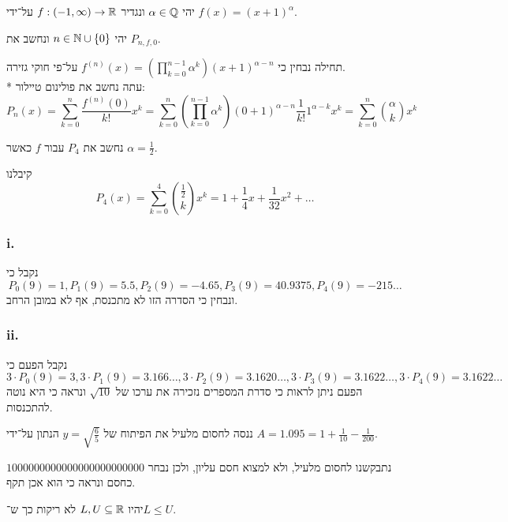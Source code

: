 \Question{}
יהי $\alpha \in \mathbb{Q}$ ונגדיר $f : (-1, \infty) \to \mathbb{R}$ על־ידי $f(x) = {(x + 1)}^\alpha$.

\Subquestion{}
יהי $n \in \mathbb{N} \cup \{0\}$ ונחשב את $P_{n, f, 0}$.

תחילה נבחין כי $f^{(n)}(x) = (\prod_{k = 0}^{n - 1} \alpha^k) {(x + 1)}^{\alpha - n}$ על־פי חוקי גזירה. \\*
עתה נחשב את פולינום טיילור:
\[
	P_n(x) = \sum_{k = 0}^{n} \frac{f^{(n)}(0)}{k!} x^k
	= \sum_{k = 0}^{n} (\prod_{k = 0}^{n - 1} \alpha^k) {(0 + 1)}^{\alpha - n} \frac{1}{k!} 1^{\alpha - k} x^k
	= \sum_{k = 0}^{n} \binom{\alpha}{k} x^k
\]

\Subquestion{}
נחשב את $P_4$ עבור $f$ כאשר $\alpha = \frac{1}{2}$.

קיבלנו
\[
	P_4(x) = \sum_{k = 0}^{4} \binom{\frac{1}{2}}{k} x^k
	= 1 + \frac{1}{4} x + \frac{1}{32} x^2 + \dots
\]

\Subquestion{}
\subsubsection{i.}
נקבל כי
\[
	P_0(9) = 1,
	P_1(9) = 5.5,
	P_2(9) = -4.65,
	P_3(9) = 40.9375,
	P_4(9) = -215\dots
\]
ונבחין כי הסדרה הזו לא מתכנסת, אף לא במובן הרחב.

\subsubsection{ii.}
נקבל הפעם כי
\[
	3 \cdot P_0(9) = 3,
	3 \cdot P_1(9) = 3.166\dots,
	3 \cdot P_2(9) = 3.1620\dots,
	3 \cdot P_3(9) = 3.1622\dots,
	3 \cdot P_4(9) = 3.1622\dots
\]
הפעם ניתן לראות כי סדרת המספרים נזכירה את ערכו של $\sqrt{10}$ ונראה כי היא נוטה להתכנסות.

\Subquestion{}
ננסה לחסום מלעיל את הפיתוח של $y = \sqrt{\frac{6}{5}}$ הנתון על־ידי $A = 1.095 = 1 + \frac{1}{10} - \frac{1}{200}$.

נתבקשנו לחסום מלעיל, ולא למצוא חסם עליון, ולכן נבחר $1000000000000000000000000$ כחסם ונראה כי הוא אכן תקף.

\Question{}
יהיו $L, U \subseteq \mathbb{R}$ לא ריקות כך ש־$L \le U$.

